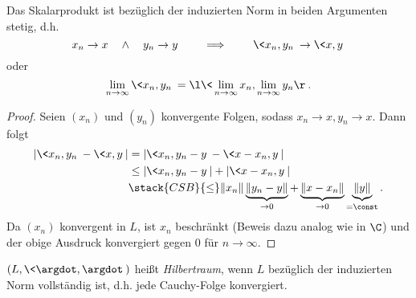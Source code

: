 \begin{kor}
	Das Skalarprodukt ist bezüglich der induzierten Norm in beiden Argumenten stetig, d.h.
	\[
		x_n \to x \quad\land\quad y_n \to y
		\qquad \implies \qquad
		\<x_n, y_n\> \to \<x,y\>
	\]
	oder
	\[
		\lim_{n\to \infty} \<x_n, y_n\> = \l\<\lim_{n\to \infty} x_n, \lim_{n\to\infty} y_n \r\>.
	\]
	\begin{proof}
	Seien $ (x_n) $ und $ (y_n) $ konvergente Folgen, sodass $ x_n \to x, y_n \to x $. Dann folgt
		\begin{align*}
			|\<x_n,y_n\> - \<x,y\>|
			&= |\<x_n, y_n - y\> - \<x-x_n,y\>| \\
			&\le |\<x_n,y_n -y\>| + |\<x-x_n,y\>| \\
			&\stack{CSB}{\le} \|x_n\| \underbrace{\|y_n -y\|}_{\to 0} + \underbrace{\|x-x_n\|}_{\to 0} \underbrace{\|y\|}_{=\const}.
			\end{align*}
		Da $(x_n)$ konvergent in $L$, ist $x_n$ beschränkt (Beweis dazu analog wie in $\C$) und der obige Ausdruck konvergiert gegen $ 0 $ für $ n\to \infty $.
	\end{proof}
\end{kor}

\begin{df}[Hilbertraum] \label{1.5}
	$(L, \<\argdot, \argdot\>)$ heißt \emph{Hilbertraum}, wenn $L$ bezüglich der induzierten Norm vollständig ist, d.h. jede Cauchy-Folge konvergiert.
\end{df}


